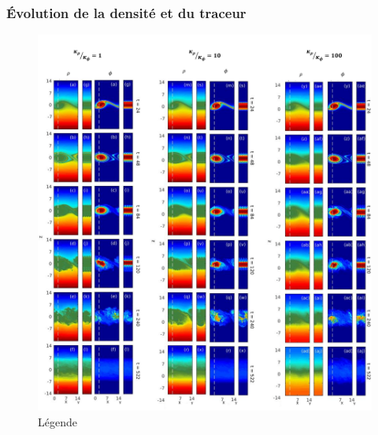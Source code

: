 \documentclass[a4paper,12pt]{article}
\begin{document}
    \subsubsection{Évolution de la densité et du traceur}

    \begin{figure}[h]
        \centering
        \label{rhodiff}
        \includegraphics[width=0.95\linewidth]{figures/rhodiff.png}
        \caption{Légende}
    \end{figure}
    
\end{document}
